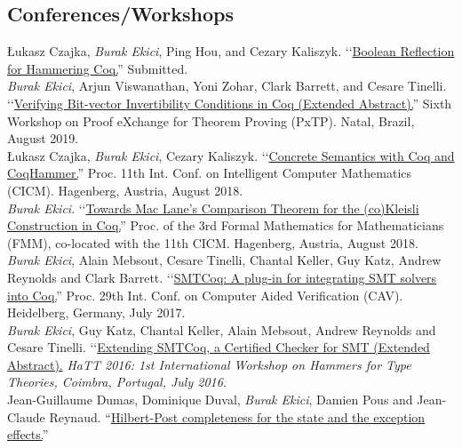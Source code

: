 \documentclass[10pt, a4paper]{article}
\newcommand{\years}[1]{\marginnote{\scriptsize #1}}
\begin{document}
\subsection*{Conferences/Workshops}
\years{\normalsize2019}
\L ukasz Czajka, \emph{Burak Ekici}, Ping Hou, and Cezary Kaliszyk.
\lq\lq{\href{ekiciburak.io}{Boolean Reflection for Hammering Coq.}}''
Submitted.
\\[0.25cm]
\years{\normalsize2019}
\emph{Burak Ekici}, Arjun Viswanathan, Yoni Zohar, Clark Barrett, and Cesare
Tinelli.
\lq\lq{\href{http://pxtp.gforge.inria.fr/2019/papers/PxTP_2019_paper_5.pdf}{Verifying Bit-vector Invertibility Conditions in Coq (Extended Abstract).}}''
Sixth Workshop on Proof eXchange for Theorem Proving (PxTP). Natal, Brazil, August 2019.
\\[0.25cm]
\years{\normalsize2018}
\L ukasz Czajka, \emph{Burak Ekici}, Cezary Kaliszyk.
\lq\lq{\href{https://www.mimuw.edu.pl/~lukaszcz/cicm2018.pdf}{Concrete Semantics with Coq and CoqHammer.}}''
Proc. 11th Int. Conf. on Intelligent Computer Mathematics (CICM). Hagenberg, Austria, August 2018.
\\[0.25cm]
\years{\normalsize2018}
\emph{Burak Ekici}.
\lq\lq{\href{https://www.cicm-conference.org/2018/infproc/paper11.pdf}{Towards Mac Lane's Comparison Theorem for the (co)Kleisli Construction in Coq.}}''
Proc. of the 3rd Formal Mathematics for Mathematicians (FMM), co-located with the 11th CICM. Hagenberg, Austria, August 2018.
\\[0.25cm]
\years{\normalsize2017}
\emph{Burak Ekici}, Alain Mebsout, Cesare Tinelli,
Chantal Keller, Guy Katz, Andrew Reynolds and Clark Barrett. 
\lq\lq{\href{http://homepage.divms.uiowa.edu/~tinelli/papers/EkiEtAl-CAV-17.pdf}{SMTCoq: A plug-in for integrating SMT solvers into Coq.}}''
Proc. 29th Int. Conf. on Computer Aided Verification (CAV). Heidelberg, Germany, July 2017.
\\[0.25cm]
\years{\normalsize2016}
\emph{Burak Ekici}, Guy Katz, Chantal Keller, Alain Mebsout, Andrew Reynolds and Cesare Tinelli.
\lq\lq{\href{http://eptcs.web.cse.unsw.edu.au/paper.cgi?HaTT2016.5}{Extending SMTCoq, a Certified Checker for SMT (Extended Abstract).}}
\emph{HaTT 2016: 1st International Workshop on Hammers for Type Theories, Coimbra, Portugal, July 2016.}
\\[0.25cm]
\years{\normalsize2015}
Jean-Guillaume Dumas, Dominique Duval, \emph{Burak Ekici}, Damien Pous and Jean-Claude Reynaud. ``\href{https://hal.archives-ouvertes.fr/hal-01121924}{Hilbert-Post completeness for the state and the exception effects.}''
\end{document}

